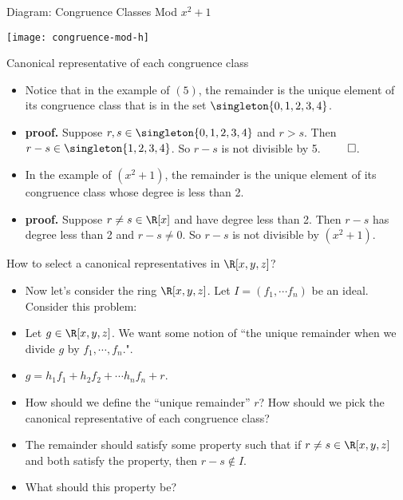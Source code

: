 \documentclass[handout]{beamer}
\begin{document}
\begin{frame}{Diagram: Congruence Classes Mod $x^2 + 1$}

\begin{center}
\texttt{[image: congruence-mod-h]}
\end{center}

\end{frame}



\begin{frame}{Canonical representative of each congruence class}

\begin{itemize}
  \item Notice that in the example of $(5)$, the remainder is the unique element of its congruence class that is in the set $\singleton{0,1,2,3,4}$.
  \item \textbf{proof.} Suppose $r,s\in \singleton{0,1,2,3,4}$ and $r> s$. Then $r-s\in \singleton{1,2,3,4}$. So $r-s$ is not divisible by 5. $\qed$.
  \item In the example of $(x^2+1)$, the remainder is the unique element of its congruence class whose degree is less than 2.
  \item \textbf{proof.} Suppose $r\not=s\in\R[x]$ and have degree less than 2. Then $r-s$ has degree less than 2 and $r-s\not=0$. So $r-s$ is not divisible
  by $(x^2+1)$.
\end{itemize}

\end{frame}



\begin{frame}{How to select a canonical representatives in $\R[x,y,z]$?}

\begin{itemize}
  \item Now let's consider the ring $\R[x,y,z]$. Let $I=(f_1,\cdots f_n)$ be an ideal. Consider this problem:
  \item Let $g\in\R[x,y,z]$. We want some notion of ``the unique remainder when we divide $g$ by $f_1,\cdots, f_n$.".
  \item $g = h_1 f_1 + h_2 f_2 + \cdots h_n f_n + r$.
  \item How should we define the ``unique remainder'' $r$? How should we pick the canonical representative of each congruence class?
  \item The remainder should satisfy some property such that if $r \not= s \in \R[x,y,z]$ and both satisfy the property, then $r-s\notin I$.
  \item What should this property be?
\end{itemize}

\end{frame}
\end{document}
